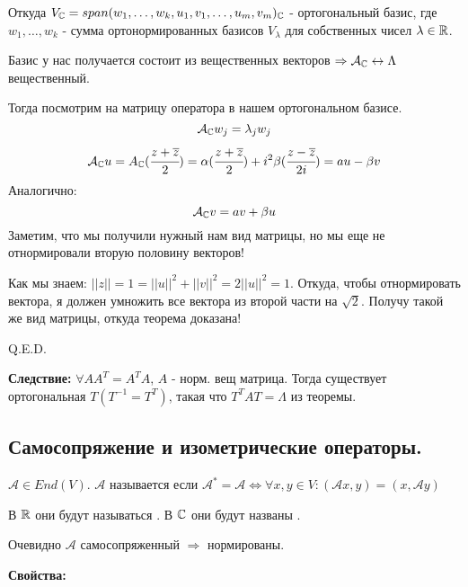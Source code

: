 Откуда $V_{\mathbb{C}} = span(w_1,\ldots,w_k, u_1,v_1,\ldots,u_m,v_m)_{\mathbb{C}}$ - ортогональный базис, где $w_1,\ldots, w_k$ - сумма ортонормированных базисов $V_\lambda$ для собственных чисел $\lambda \in \mathbb{R}$.

Базис у нас получается состоит из вещественных векторов $\Rightarrow \mathcal{A}_{\mathbb{C}}\leftrightarrow \Lambda$ вещественный. 

Тогда посмотрим на матрицу оператора в нашем ортогональном базисе. 
$$\mathcal{A}_{\mathbb{C}} w_j = \lambda_j w_j$$
$$ \mathcal{A}_{\mathbb{C}} u = A_{\mathbb{C}} (\cfrac{z + \overline{z}}{2}) =\alpha (\cfrac{z+\overline{z}}{2}) + i^2 \beta (\cfrac{z-\overline{z}}{2i})  = au - \beta v$$
Аналогично:
$$\mathcal{A}_{\mathbb{C}} v = av + \beta u$$
Заметим, что мы получили нужный нам вид матрицы, но мы еще не отнормировали вторую половину векторов!

Как мы знаем: $||z|| = 1 =||u||^2 + ||v ||^2 = 2 ||u||^2 = 1$. Откуда, чтобы отнормировать вектора, я должен умножить все вектора из второй части на $\sqrt{2}$. Получу такой же вид матрицы, откуда теорема доказана!

\hfill Q.E.D.

\textbf{Следствие:} $\forall AA^T =A^T A$, $A$ - норм. вещ матрица. Тогда существует ортогональная $T (T^{-1}=T^T)$, такая что $T^TAT = \Lambda$ из теоремы.






\newpage
\subsection{Самосопряжение и изометрические операторы.}


 $\mathcal{A}\in End(V)$. $\mathcal{A}$ называется  если $\mathcal{A}^* =\mathcal{A} \Leftrightarrow \forall x,y \in V: (\mathcal{A}x,y) = (x,\mathcal{A}y) $

В $\mathbb{R}$ они будут называться . В $\mathbb{C}$ они будут названы . 

Очевидно $\mathcal{A}$ самосопряженный $\Rightarrow$ нормированы.

\textbf{Свойства:}

